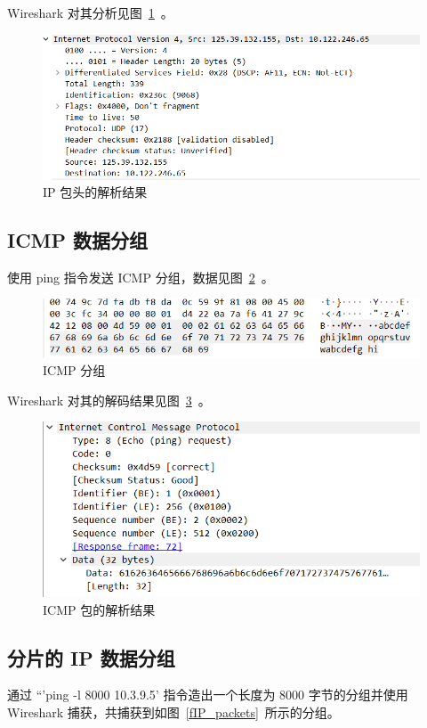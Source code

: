 \documentclass[blue,normal,cn]{elegantnote}
\begin{document}
Wireshark 对其分析见图~\ref{IP_result}~。

\begin{figure}[!htbp]
	\centering
	\includegraphics[width=.7\textwidth]{IP_result.png}
	\caption{IP 包头的解析结果}
	\label{IP_result}
\end{figure}

\subsection{ICMP 数据分组}
使用 ping 指令发送 ICMP 分组，数据见图~\ref{ICMP_raw}~。

\begin{figure}[!htbp]
	\centering
	\includegraphics[width=.7\textwidth]{ICMP_raw.png}
	\caption{ICMP 分组}
	\label{ICMP_raw}
\end{figure}

Wireshark 对其的解码结果见图~\ref{ICMP_result}~。

\begin{figure}[!htbp]
	\centering
	\includegraphics[width=.7\textwidth]{ICMP_result.png}
	\caption{ICMP 包的解析结果}
	\label{ICMP_result}
\end{figure}

\subsection{分片的 IP 数据分组}
通过 ``'ping -l 8000 10.3.9.5' 指令造出一个长度为 8000 字节的分组并使用 Wireshark 捕获，共捕获到如图~\ref{fIP_packets}~所示的分组。
\end{document}
